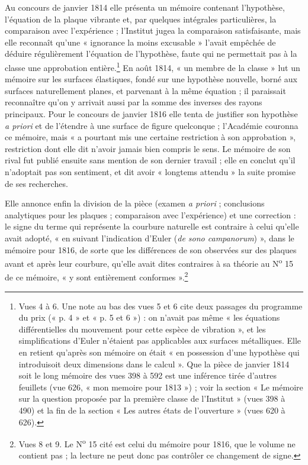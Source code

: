 \documentclass[11pt,a4paper]{article}
\begin{document}
Au concours de janvier 1814 elle présenta un mémoire contenant l'hypothèse,
l'équation de la plaque vibrante et, par quelques intégrales particulières, la
comparaison avec l'expérience ; l'Institut jugea la comparaison satisfaisante,
mais elle reconnaît qu'une « ignorance la moins excusable » l'avait empêchée de
déduire régulièrement l'équation de l'hypothèse, faute qui ne permettait pas à
la classe une approbation entière.\footnote{Vues 4 à 6. Une note au bas des
vues 5 et 6 cite deux passages du programme du prix (« p. 4 » et « p. 5 et
6 ») : on n'avait pas même « les équations différentielles du mouvement pour
cette espèce de vibration », et les simplifications d'Euler n'étaient pas
applicables aux surfaces métalliques. Elle en retient qu'après son mémoire on
était « en possession d'une hypothèse qui introduisoit deux dimensions dans le
calcul ». Que la pièce de janvier 1814 soit le long mémoire des vues 398 à 592
est une inférence tirée d'autres feuillets (vue 626, « mon memoire pour
1813 ») ; voir la section « Le mémoire sur la question proposée par la première classe de l'Institut » (vues 398 à 490) et la fin de la section « Les autres états de l'ouverture » (vues 620 à 626).} En août 1814, « un membre de
la classe » lut un mémoire sur les surfaces élastiques, fondé sur une hypothèse
nouvelle, borné aux surfaces naturellement planes, et parvenant à la même
équation ; il paraissait reconnaître qu'on y arrivait aussi par la somme des
inverses des rayons principaux. Pour le concours de janvier 1816 elle tenta de
justifier son hypothèse \emph{a priori} et de l'étendre à une surface de figure
quelconque ; l'Académie couronna ce mémoire, mais « a pourtant mis une
certaine restriction à son approbation », restriction dont elle dit n'avoir jamais bien
compris le sens. Le mémoire de son rival fut publié ensuite sans mention de
son dernier travail ; elle en conclut qu'il n'adoptait pas son sentiment, et
dit avoir « longtems attendu » la suite promise de ses recherches.

Elle annonce enfin la division de la pièce (examen \emph{a priori} ;
conclusions analytiques pour les plaques ; comparaison avec l'expérience) et
une correction : le signe du terme qui représente la courbure naturelle est
contraire à celui qu'elle avait adopté, « en suivant l'indication d'Euler
(\emph{de sono campanorum}) », dans le mémoire pour 1816, de sorte que les
différences de son observées sur des plaques avant et après leur courbure,
qu'elle avait dites contraires à sa théorie au N\textsuperscript{o} 15 de ce
mémoire, « y sont entièrement conformes ».\footnote{Vues 8 et 9. Le
N\textsuperscript{o} 15 cité est celui du mémoire pour 1816, que le volume ne
contient pas ; la lecture ne peut donc pas contrôler ce changement de signe.}
\end{document}
